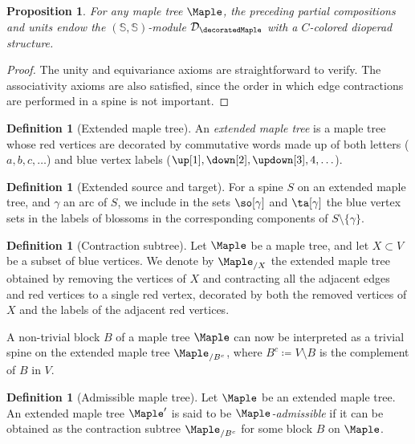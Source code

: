 \documentclass{amsart}
\newtheorem{proposition}[theorem]{Proposition}
\theoremstyle{definition}
\newtheorem{definition}[theorem]{Definition}
\newcommand{\guillaume}[1]{\todo[color=orange!30]{#1 --- G.}}
\newcommand{\dioperad}{\mathcal{D}} %
\begin{document}
\begin{proposition} 
\label{prop:dioperadstructure}
  For any maple tree $\Maple$, the preceding partial compositions and units endow the $(\mathbb{S},\mathbb{S})$-module $\dioperad_{\decoratedMaple}$ with a $C$-colored dioperad structure.
\end{proposition}

\begin{proof}
The unity and equivariance axioms are straightforward to verify. 
The associativity axioms are also satisfied, since the order in which edge contractions are performed in a spine is not important.
\guillaume{plus de d\'etails?}
\end{proof}

\begin{definition}[Extended maple tree]
  An \emph{extended maple tree} is a maple tree whose red vertices are decorated by commutative words made up of both letters ($a,b,c,\ldots$) and blue vertex labels ($\up[1],\down[2],\updown[3],4,\ldots$). 
\end{definition}

\begin{definition}[Extended source and target]
  For a spine $S$ on an extended maple tree, and $\gamma$ an arc of $S$, we include in the sets $\so[\gamma]$ and $\ta[\gamma]$ the blue vertex sets in the labels of blossoms in the corresponding components of $S\setminus \{\gamma\}$.
\end{definition}

\begin{definition}[Contraction subtree] 
Let $\Maple$ be a maple tree, and let $X \subset V$ be a subset of blue vertices. 
We denote by $\Maple_{/X}$ the extended maple tree obtained by removing the vertices of $X$ and contracting all the adjacent edges and red vertices to a single red vertex, decorated by both the removed vertices of $X$ and the labels of the adjacent red vertices. 
\guillaume{dessin}
\end{definition}

A non-trivial block $B$ of a maple tree $\Maple$ can now be interpreted as a trivial spine on the extended maple tree $\Maple_{/{B^c}}$, where $B^c\coloneqq V\setminus B$ is the complement of $B$ in $V$. 

\begin{definition}[Admissible maple tree]
  Let $\Maple$ be an extended maple tree. 
  An extended maple tree $\Maple'$ is said to be \emph{$\Maple$-admissible} if it can be obtained as the contraction subtree $\Maple_{/{B^c}}$ for some block $B$ on $\Maple$. 
\end{definition}
\end{document}
